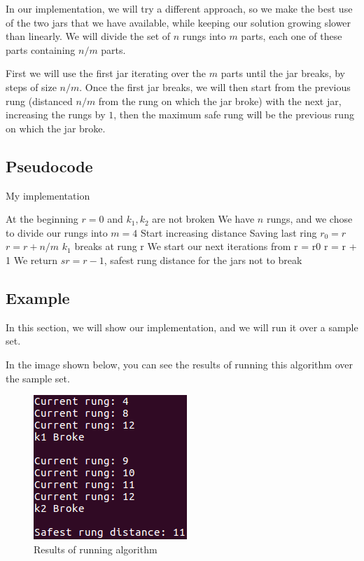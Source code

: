 \documentclass{article}
\begin{document}
In our implementation, we will try a different approach, so we make the best use of the two jars that we have available, while keeping our solution growing slower than linearly. We will divide the set of $n$ rungs into $m$ parts, each one of these parts containing $n/m$ parts.

First we will use the first jar iterating over the $m$ parts until the jar breaks, by steps of size $n/m$. Once the first jar breaks, we will then start from the previous rung (distanced $n/m$ from the rung on which the jar broke) with the next jar, increasing the rungs by $1$, then the maximum safe rung will be the previous rung on which the jar broke.
 
\subsection*{Pseudocode}

\begin{algorithm}[H]
\caption{My implementation}
\begin{algorithmic}[1]
\State At the beginning $r = 0$ and $k_1,k_2$ are not broken
\State We have $n$ rungs, and we chose to divide our rungs into $m = 4$
 \State Start increasing distance
 \State Saving last ring $r_0 = r$
 \State $r = r + n/m$
  \State $k_1$ breaks at rung r
 \EndIf
\EndWhile
\State We start our next iterations from r = r0
 \State r = r + 1
  \State We return $sr = r-1$, safest rung distance for the jars not to break
 \EndIf 
\EndWhile
\end{algorithmic}
\end{algorithm}

\subsection*{Example}

In this section, we will show our implementation, and we will run it over a sample set.



In the image shown below, you can see the results of running this algorithm over the sample set.

\begin{figure}[H]
\begin{center}
\includegraphics[scale=.8]{problem1a}
\end{center}
\caption{Results of running algorithm}
\end{figure}
\end{document}
